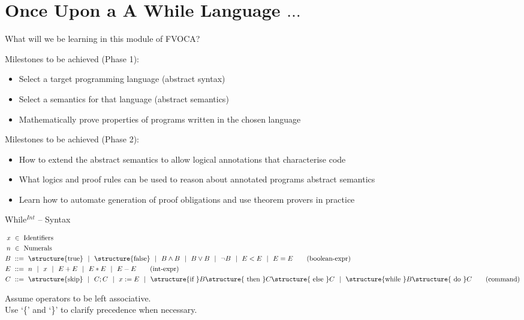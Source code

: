 \documentclass[aspectratio=169]{beamer}
\begin{document}
\frame[plain]{\titlepage}


\section{Once Upon a A While Language $\ldots$}

\newcommand{\kw}[1]{\structure{\text{#1}}}

\begin{slide}{What will we be learning in this module of FVOCA?}
\begin{block}{Milestones to be achieved (Phase 1):}
\begin{itemize}
  \item Select a target programming language (abstract syntax)
  \item Select a semantics for that language (abstract semantics)
  \item Mathematically prove properties of programs written in the chosen language
\end{itemize}
\end{block}

\begin{block}{Milestones to be achieved (Phase 2):}
\begin{itemize}
  \item How to extend the abstract semantics to allow logical annotations that characterise code
  \item What logics and proof rules can be used to reason about annotated programs abstract semantics
  \item Learn how to automate generation of proof obligations and use theorem provers in practice 
\end{itemize}
\end{block}

  
\end{slide}


\begin{slide}{While$^{Int}$ -- Syntax}
\small

\begin{align*}
  x &~\in~ \text{Identifiers}
  \\
  n &~\in~ \text{Numerals}
  \\
  B &~::=~ \kw{true} ~~|~~ \kw{false}  ~~|~~ B \land B ~~|~~ B \lor B ~~|~~ \lnot B ~~|~~ E<E ~~|~~ E=E
  \tag{boolean-expr}\\
  E &~::=~ n ~~|~~ x ~~|~~ E+E ~~|~~ E*E ~~|~~ E-E
  \tag{int-expr}\\
  C &~::=~ \kw {skip} ~~|~~ C;C ~~|~~ x:=E
 ~~|~~  \kw{if } B \kw{ then } C\kw{ else }C ~~|~~  \kw{while }B\kw{ do }C
  \tag{command}
\end{align*}

Assume operators to be left associative.
\\Use `\{' and `\}' to clarify precedence when necessary.

\end{slide}
\end{document}
